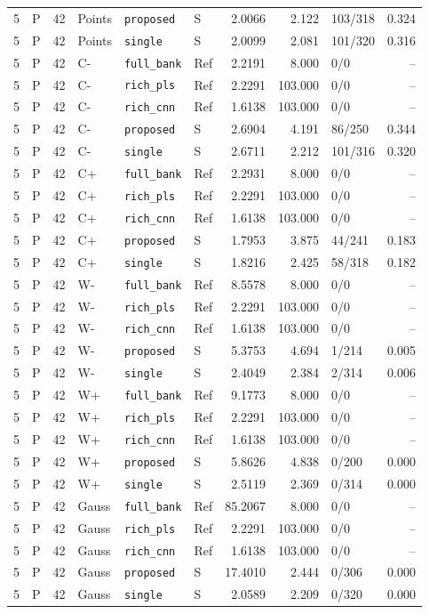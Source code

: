 \documentclass[10pt,a4paper]{article}
\begin{document}
\begin{longtable}{rlrlllrrlr}
5 & P & 42 & Points & \texttt{proposed} & S & 2.0066 & 2.122 & 103/318 & 0.324 \\
5 & P & 42 & Points & \texttt{single} & S & 2.0099 & 2.081 & 101/320 & 0.316 \\
5 & P & 42 & C- & \texttt{full\_bank} & Ref & 2.2191 & 8.000 & 0/0 & -- \\
5 & P & 42 & C- & \texttt{rich\_pls} & Ref & 2.2291 & 103.000 & 0/0 & -- \\
5 & P & 42 & C- & \texttt{rich\_cnn} & Ref & 1.6138 & 103.000 & 0/0 & -- \\
5 & P & 42 & C- & \texttt{proposed} & S & 2.6904 & 4.191 & 86/250 & 0.344 \\
5 & P & 42 & C- & \texttt{single} & S & 2.6711 & 2.212 & 101/316 & 0.320 \\
5 & P & 42 & C+ & \texttt{full\_bank} & Ref & 2.2931 & 8.000 & 0/0 & -- \\
5 & P & 42 & C+ & \texttt{rich\_pls} & Ref & 2.2291 & 103.000 & 0/0 & -- \\
5 & P & 42 & C+ & \texttt{rich\_cnn} & Ref & 1.6138 & 103.000 & 0/0 & -- \\
5 & P & 42 & C+ & \texttt{proposed} & S & 1.7953 & 3.875 & 44/241 & 0.183 \\
5 & P & 42 & C+ & \texttt{single} & S & 1.8216 & 2.425 & 58/318 & 0.182 \\
5 & P & 42 & W- & \texttt{full\_bank} & Ref & 8.5578 & 8.000 & 0/0 & -- \\
5 & P & 42 & W- & \texttt{rich\_pls} & Ref & 2.2291 & 103.000 & 0/0 & -- \\
5 & P & 42 & W- & \texttt{rich\_cnn} & Ref & 1.6138 & 103.000 & 0/0 & -- \\
5 & P & 42 & W- & \texttt{proposed} & S & 5.3753 & 4.694 & 1/214 & 0.005 \\
5 & P & 42 & W- & \texttt{single} & S & 2.4049 & 2.384 & 2/314 & 0.006 \\
5 & P & 42 & W+ & \texttt{full\_bank} & Ref & 9.1773 & 8.000 & 0/0 & -- \\
5 & P & 42 & W+ & \texttt{rich\_pls} & Ref & 2.2291 & 103.000 & 0/0 & -- \\
5 & P & 42 & W+ & \texttt{rich\_cnn} & Ref & 1.6138 & 103.000 & 0/0 & -- \\
5 & P & 42 & W+ & \texttt{proposed} & S & 5.8626 & 4.838 & 0/200 & 0.000 \\
5 & P & 42 & W+ & \texttt{single} & S & 2.5119 & 2.369 & 0/314 & 0.000 \\
5 & P & 42 & Gauss & \texttt{full\_bank} & Ref & 85.2067 & 8.000 & 0/0 & -- \\
5 & P & 42 & Gauss & \texttt{rich\_pls} & Ref & 2.2291 & 103.000 & 0/0 & -- \\
5 & P & 42 & Gauss & \texttt{rich\_cnn} & Ref & 1.6138 & 103.000 & 0/0 & -- \\
5 & P & 42 & Gauss & \texttt{proposed} & S & 17.4010 & 2.444 & 0/306 & 0.000 \\
5 & P & 42 & Gauss & \texttt{single} & S & 2.0589 & 2.209 & 0/320 & 0.000 \\
\end{longtable}
\endgroup
\end{document}
